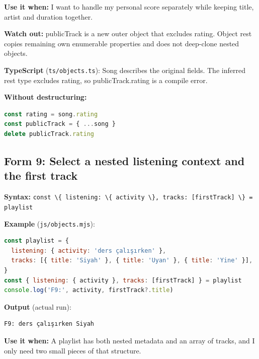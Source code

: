 \documentclass[
  10pt,
  a4paper,
  titlepage]{article}
\newcommand{\passthrough}[1]{#1}
\begin{document}
\textbf{Use it when:} I want to handle my personal score separately
while keeping title, artist and duration together.

\textbf{Watch out:} publicTrack is a new outer object that excludes
rating. Object rest copies remaining own enumerable properties and does
not deep-clone nested objects.

\textbf{TypeScript} (\passthrough{\lstinline!ts/objects.ts!}): Song
describes the original fields. The inferred rest type excludes rating,
so publicTrack.rating is a compile error.


\textbf{Without destructuring:}

\Needspace{51.5pt}
\begin{lstlisting}[language=JavaScript]
const rating = song.rating
const publicTrack = { ...song }
delete publicTrack.rating
\end{lstlisting}

\subsection{Form 9: Select a nested listening context and the first
track}\label{form-9-select-a-nested-listening-context-and-the-first-track}

\textbf{Syntax:}
\passthrough{\lstinline!const \{ listening: \{ activity \}, tracks: [firstTrack] \} = playlist!}


\textbf{Example} (\passthrough{\lstinline!js/objects.mjs!}):

\Needspace{82.4pt}
\begin{lstlisting}[language=JavaScript]
const playlist = {
  listening: { activity: 'ders çalışırken' },
  tracks: [{ title: 'Siyah' }, { title: 'Uyan' }, { title: 'Yine' }],
}
const { listening: { activity }, tracks: [firstTrack] } = playlist
console.log('F9:', activity, firstTrack?.title)
\end{lstlisting}


\textbf{Output} (actual run):

\Needspace{30.9pt}
\begin{lstlisting}
F9: ders çalışırken Siyah
\end{lstlisting}

\textbf{Use it when:} A playlist has both nested metadata and an array
of tracks, and I only need two small pieces of that structure.
\end{document}
